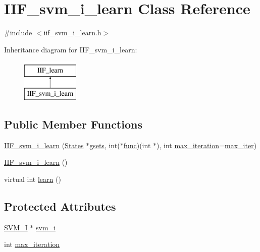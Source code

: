 \hypertarget{classIIF__svm__i__learn}{}\section{I\+I\+F\+\_\+svm\+\_\+i\+\_\+learn Class Reference}
\label{classIIF__svm__i__learn}


{\ttfamily \#include $<$iif\+\_\+svm\+\_\+i\+\_\+learn.\+h$>$}

Inheritance diagram for I\+I\+F\+\_\+svm\+\_\+i\+\_\+learn\+:\begin{figure}[H]
\begin{center}
\leavevmode
\includegraphics[height=2.000000cm]{classIIF__svm__i__learn}
\end{center}
\end{figure}
\subsection*{Public Member Functions}
\begin{DoxyCompactItemize}
\item 
\hyperlink{classIIF__svm__i__learn_a5a9eece691630be27e994f4300d83fff}{I\+I\+F\+\_\+svm\+\_\+i\+\_\+learn} (\hyperlink{classStates}{States} $\ast$\hyperlink{classIIF__learn_a2c2157269ef33cd2881ed48c5b38946a}{gsets}, int($\ast$\hyperlink{classIIF__learn_a19119795c6b5360d2e8b3ed2073642d6}{func})(int $\ast$), int \hyperlink{classIIF__svm__i__learn_a9beafc489be7aa975aef083ffb1cb270}{max\+\_\+iteration}=\hyperlink{config_8h_a7a2c49f1d0b87e326420efb7e71cb89f}{max\+\_\+iter})
\item 
\hyperlink{classIIF__svm__i__learn_ab1a6ba49ba6018d49477ba2577182b03}{I\+I\+F\+\_\+svm\+\_\+i\+\_\+learn} ()
\item 
virtual int \hyperlink{classIIF__svm__i__learn_a054c277c00d749f8eaec0f1eb7156b21}{learn} ()
\end{DoxyCompactItemize}
\subsection*{Protected Attributes}
\begin{DoxyCompactItemize}
\item 
\hyperlink{classSVM__I}{S\+V\+M\+\_\+I} $\ast$ \hyperlink{classIIF__svm__i__learn_ac9a29f27106b99d511d8ab8dee18831d}{svm\+\_\+i}
\item 
int \hyperlink{classIIF__svm__i__learn_a9beafc489be7aa975aef083ffb1cb270}{max\+\_\+iteration}
\end{DoxyCompactItemize}

